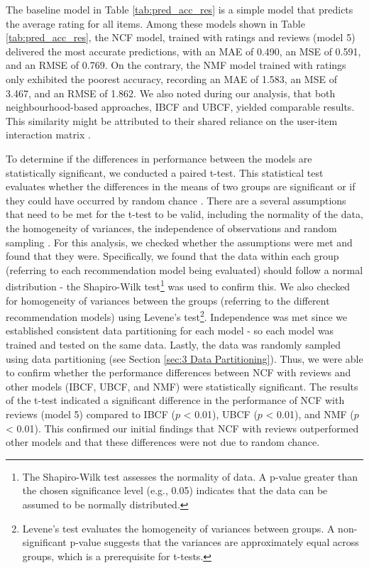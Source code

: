 The baseline model in Table \ref{tab:pred_acc_res} is a simple model that predicts the average rating for all items. Among these models shown in Table \ref{tab:pred_acc_res}, the NCF model, trained with ratings and reviews (model 5) delivered the most accurate predictions, with an MAE of 0.490, an MSE of 0.591, and an RMSE of 0.769. On the contrary, the NMF model trained with ratings only exhibited the poorest accuracy, recording an MAE of 1.583, an MSE of 3.467, and an RMSE of 1.862. We also noted during our analysis, that both neighbourhood-based approaches, IBCF and UBCF, yielded comparable results. This similarity might be attributed to their shared reliance on the user-item interaction matrix \cite{jia2015user}. 

To determine if the differences in performance between the models are statistically significant, we conducted a paired t-test. This statistical test evaluates whether the differences in the means of two groups are significant or if they could have occurred by random chance \cite{manfei2017differences}. There are a several assumptions that need to be met for the t-test to be valid, including the normality of the data, the homogeneity of variances, the independence of observations and random sampling \cite{manfei2017differences}. For this analysis, we checked whether the assumptions were met and found that they were. Specifically, we found that the data within each group (referring to each recommendation model being evaluated) should follow a normal distribution - the Shapiro-Wilk test\footnote{The Shapiro-Wilk test assesses the normality of data. A p-value greater than the chosen significance level (e.g., 0.05) indicates that the data can be assumed to be normally distributed.} was used to confirm this. We also checked for homogeneity of variances between the groups (referring to the different recommendation models) using Levene's test\footnote{Levene's test evaluates the homogeneity of variances between groups. A non-significant p-value suggests that the variances are approximately equal across groups, which is a prerequisite for t-tests.}. Independence was met since we established consistent data partitioning for each model - so each model was trained and tested on the same data. Lastly, the data was randomly sampled using data partitioning (see Section \ref{sec:3 Data Partitioning}). Thus, we were able to confirm whether the performance differences between NCF with reviews and other models (IBCF, UBCF, and NMF) were statistically significant. The results of the t-test indicated a significant difference in the performance of NCF with reviews (model 5) compared to IBCF ($p$ < 0.01), UBCF ($p$ < 0.01), and NMF ($p$ < 0.01). This confirmed our initial findings that NCF with reviews outperformed other models and that these differences were not due to random chance. 


